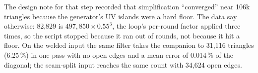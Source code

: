 The design note for that step recorded that simplification ``converged'' near
106k triangles because the generator's UV islands were a hard floor. The data say
otherwise: 82,829 is $497{,}850 \times 0.55^3$, the loop's per-round factor
applied three times, so the script stopped because it ran out of rounds, not
because it hit a floor. On the welded input the same filter takes the companion
to 31,116 triangles (6.25\,\%) in one pass with no open edges and a mean error of
0.014\,\% of the diagonal; the seam-split input reaches the same count with
34,624 open edges.
